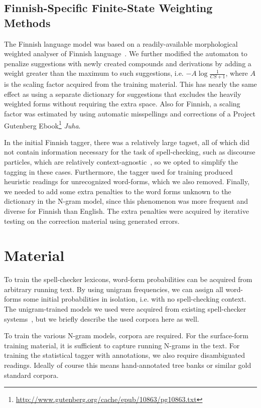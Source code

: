 \documentclass{llncs}
\begin{document}
\subsection{Finnish-Specific Finite-State Weighting Methods}

The Finnish language model was based on a readily-available morphological
weighted analyser of Finnish language~\cite{pirinen/2011/nodalida}.  We further
modified the automaton to penalize suggestions with newly created compounds and
derivations by adding a weight greater than the maximum to such suggestions,
i.e. $-A\log\frac{1}{CS+1}$, where $A$ is the scaling factor acquired from the
training material. This has nearly the same effect as using a separate
dictionary for suggestions that excludes the heavily weighted forms without
requiring the extra space.  Also for Finnish, a scaling factor was estimated by
using automatic misspellings and corrections of a Project Gutenberg
Ebook\footnote{\url{http://www.gutenberg.org/cache/epub/10863/pg10863.txt}}
\emph{Juha}.

In the initial Finnish tagger, there was a relatively large tagset, all of
which did not contain information necessary for the task of
spell-checking, such as discourse particles, which are relatively
context-agnostic~\cite{visk}, so we opted to simplify the tagging in these
cases. Furthermore, the tagger used for training produced heuristic readings for
unrecognized word-forms, which we also removed. Finally, we needed to add
some extra penalties to the word forms unknown to the dictionary in the 
N-gram model, since this phenomenon was more frequent and diverse for Finnish
than English. The extra penalties were acquired by iterative testing on the
correction material using generated errors.


\section{Material}
\label{sec:material}

To train the spell-checker lexicons, word-form probabilities can be acquired
from arbitrary running text. By using unigram frequencies, we can assign
all word-forms some initial probabilities in isolation, i.e. with no spell-checking context.
The unigram-trained models we used were acquired from existing 
spell-checker systems~\cite{norvig/2010,pirinen/2010/lrec}, but we briefly
describe the used corpora here as well.

To train the various N-gram models, corpora are required. For the surface-form
training material, it is sufficient to capture running N-grams in the text.
For training the statistical tagger with annotations, we also require 
disambiguated readings. Ideally of course this means hand-annotated
tree banks or similar gold standard corpora. 
\end{document}
